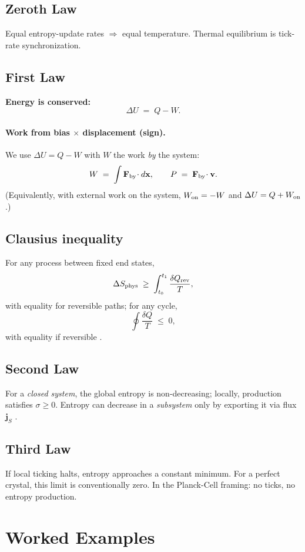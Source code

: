 \documentclass[11pt,oneside]{article}
\begin{document}
\subsection*{Zeroth Law}
Equal entropy-update rates \(\Rightarrow\) equal temperature. Thermal equilibrium is tick-rate synchronization.

\subsection*{First Law}
\textbf{Energy is conserved:}
\[
\Delta U \;=\; Q - W.
\]
\paragraph{Work from bias \(\times\) displacement (sign).}
We use \( \Delta U = Q - W\) with \(W\) the work \emph{by} the system:
\[
W \;=\; \int \mathbf F_{\rm by}\!\cdot d\mathbf x,\qquad
P \;=\; \mathbf F_{\rm by}\!\cdot \mathbf v.
\]
(Equivalently, with external work on the system, \(W_{\rm on}=-W\) and \(\Delta U=Q+W_{\rm on}\).)

\subsection*{Clausius inequality}
For any process between fixed end states,
\[
\Delta S_{\mathrm{phys}} \;\ge\; \int_{t_0}^{t_1} \frac{\delta Q_{\rm rev}}{T},
\]
with equality for reversible paths; for any cycle,
\[
\oint \frac{\delta Q}{T} \;\le\; 0,
\]
with equality if reversible \cite{clausius1879mechanical,callen1985thermodynamics}.

\subsection*{Second Law}
For a \emph{closed system}, the global entropy is non-decreasing; locally, production satisfies \(\sigma\ge 0\).
Entropy can decrease in a \emph{subsystem} only by exporting it via flux \(\mathbf j_S\) \cite{boltzmann1872,shannon1948mathematical,zeh2007arrow}.

\subsection*{Third Law}
If local ticking halts, entropy approaches a constant minimum. For a perfect crystal, this limit is conventionally zero. In the Planck-Cell framing: no ticks, no entropy production.

\section{Worked Examples}
\end{document}
